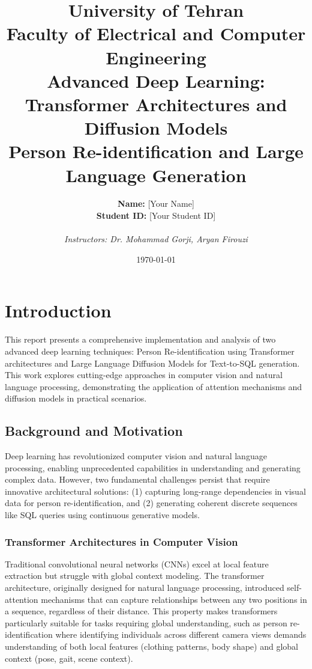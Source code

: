 \documentclass[a4paper,12pt]{article}
\title{
    \vspace{1cm}
    \textbf{University of Tehran} \\
    Faculty of Electrical and Computer Engineering \\
    \vspace{1cm}
    \textbf{Advanced Deep Learning: Transformer Architectures and Diffusion Models} \\
    \large Person Re-identification and Large Language Generation
    \vspace{1cm}
}
\author{
    \textbf{Name:} [Your Name] \\
    \textbf{Student ID:} [Your Student ID] \\
    \vspace{0.5cm} \\
    \textit{Instructors: Dr. Mohammad Gorji, Aryan Firouzi}
}
\date{\today}
\begin{document}
\maketitle
\tableofcontents
\newpage

\section{Introduction}

This report presents a comprehensive implementation and analysis of two advanced deep learning techniques: Person Re-identification using Transformer architectures and Large Language Diffusion Models for Text-to-SQL generation. This work explores cutting-edge approaches in computer vision and natural language processing, demonstrating the application of attention mechanisms and diffusion models in practical scenarios.

\subsection{Background and Motivation}

Deep learning has revolutionized computer vision and natural language processing, enabling unprecedented capabilities in understanding and generating complex data. However, two fundamental challenges persist that require innovative architectural solutions: (1) capturing long-range dependencies in visual data for person re-identification, and (2) generating coherent discrete sequences like SQL queries using continuous generative models.

\subsubsection{Transformer Architectures in Computer Vision}

Traditional convolutional neural networks (CNNs) excel at local feature extraction but struggle with global context modeling. The transformer architecture, originally designed for natural language processing, introduced self-attention mechanisms that can capture relationships between any two positions in a sequence, regardless of their distance. This property makes transformers particularly suitable for tasks requiring global understanding, such as person re-identification where identifying individuals across different camera views demands understanding of both local features (clothing patterns, body shape) and global context (pose, gait, scene context).
\end{document}
